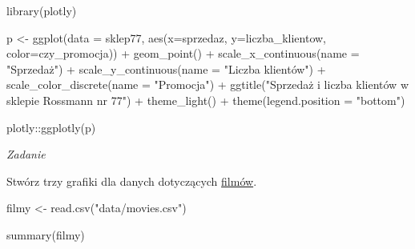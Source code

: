 \documentclass[
]{book}
\newenvironment{Shaded}{\begin{snugshade}}{\end{snugshade}}
\newcommand{\AttributeTok}[1]{\textcolor[rgb]{0.77,0.63,0.00}{#1}}
\newcommand{\FunctionTok}[1]{\textcolor[rgb]{0.00,0.00,0.00}{#1}}
\newcommand{\NormalTok}[1]{#1}
\newcommand{\OtherTok}[1]{\textcolor[rgb]{0.56,0.35,0.01}{#1}}
\newcommand{\SpecialCharTok}[1]{\textcolor[rgb]{0.00,0.00,0.00}{#1}}
\newcommand{\StringTok}[1]{\textcolor[rgb]{0.31,0.60,0.02}{#1}}
\begin{document}
\begin{Shaded}
\begin{Highlighting}[]
\FunctionTok{library}\NormalTok{(plotly)}

\NormalTok{p }\OtherTok{\textless{}{-}} \FunctionTok{ggplot}\NormalTok{(}\AttributeTok{data =}\NormalTok{ sklep77, }\FunctionTok{aes}\NormalTok{(}\AttributeTok{x=}\NormalTok{sprzedaz, }\AttributeTok{y=}\NormalTok{liczba\_klientow, }\AttributeTok{color=}\NormalTok{czy\_promocja)) }\SpecialCharTok{+}
  \FunctionTok{geom\_point}\NormalTok{() }\SpecialCharTok{+}
  \FunctionTok{scale\_x\_continuous}\NormalTok{(}\AttributeTok{name =} \StringTok{"Sprzedaż"}\NormalTok{) }\SpecialCharTok{+}
  \FunctionTok{scale\_y\_continuous}\NormalTok{(}\AttributeTok{name =} \StringTok{"Liczba klientów"}\NormalTok{) }\SpecialCharTok{+}
  \FunctionTok{scale\_color\_discrete}\NormalTok{(}\AttributeTok{name =} \StringTok{"Promocja"}\NormalTok{) }\SpecialCharTok{+}
  \FunctionTok{ggtitle}\NormalTok{(}\StringTok{"Sprzedaż i liczba klientów w sklepie Rossmann nr 77"}\NormalTok{) }\SpecialCharTok{+}
  \FunctionTok{theme\_light}\NormalTok{() }\SpecialCharTok{+}
  \FunctionTok{theme}\NormalTok{(}\AttributeTok{legend.position =} \StringTok{"bottom"}\NormalTok{)}

\NormalTok{plotly}\SpecialCharTok{::}\FunctionTok{ggplotly}\NormalTok{(p)}
\end{Highlighting}
\end{Shaded}

\emph{Zadanie}

Stwórz trzy grafiki dla danych dotyczących \href{data/movies.csv}{filmów}.

\begin{Shaded}
\begin{Highlighting}[]
\NormalTok{filmy }\OtherTok{\textless{}{-}} \FunctionTok{read.csv}\NormalTok{(}\StringTok{"data/movies.csv"}\NormalTok{)}

\FunctionTok{summary}\NormalTok{(filmy)}
\end{Highlighting}
\end{Shaded}
\end{document}

